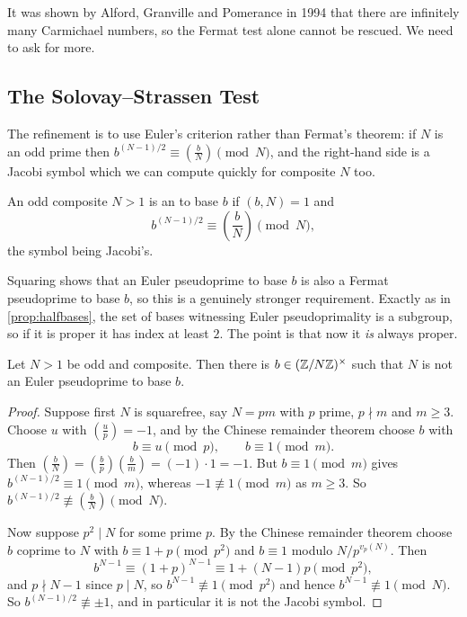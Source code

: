\documentclass[a4paper]{scrartcl}
\newcommand{\leg}[2]{\left( \frac{#1}{#2} \right)}
\begin{document}
It was shown by Alford, Granville and Pomerance in 1994 that there are infinitely many Carmichael numbers, so the Fermat test alone cannot be rescued. We need to ask for more.

\subsection{The Solovay--Strassen Test}

The refinement is to use Euler's criterion rather than Fermat's theorem: if $N$ is an odd prime then $b^{(N-1)/2} \equiv \left(\frac bN\right) \pmod N$, and the right-hand side is a Jacobi symbol which we can compute quickly for composite $N$ too.

\begin{definition}
	An odd composite $N > 1$ is an  to base $b$ if $(b, N) = 1$ and
	$$
	b^{(N-1)/2} \equiv \leg bN \pmod N,
	$$
	the symbol being Jacobi's.
\end{definition}

Squaring shows that an Euler pseudoprime to base $b$ is also a Fermat pseudoprime to base $b$, so this is a genuinely stronger requirement. Exactly as in \autoref{prop:halfbases}, the set of bases witnessing Euler pseudoprimality is a subgroup, so if it is proper it has index at least $2$. The point is that now it \emph{is} always proper.

\begin{theorem}\label{thm:eulerwitness}
	Let $N > 1$ be odd and composite. Then there is $b \in (\mathbb{Z}/N\mathbb{Z})^\times$ such that $N$ is not an Euler pseudoprime to base $b$.
\end{theorem}
\begin{proof}
	Suppose first $N$ is squarefree, say $N = pm$ with $p$ prime, $p \nmid m$ and $m \geq 3$. Choose $u$ with $\left(\frac up\right) = -1$, and by the Chinese remainder theorem choose $b$ with
	$$
	b \equiv u \pmod p, \qquad b \equiv 1 \pmod m.
	$$
	Then $\left(\frac bN\right) = \left(\frac bp\right)\left(\frac bm\right) = (-1)\cdot 1 = -1$. But $b \equiv 1 \pmod m$ gives $b^{(N-1)/2}\equiv 1 \pmod m$, whereas $-1 \not\equiv 1 \pmod m$ as $m \geq 3$. So $b^{(N-1)/2}\not\equiv\left(\frac bN\right) \pmod N$.

	Now suppose $p^2 \mid N$ for some prime $p$. By the Chinese remainder theorem choose $b$ coprime to $N$ with $b \equiv 1 + p \pmod{p^2}$ and $b \equiv 1$ modulo $N/p^{v_p(N)}$. Then
	$$
	b^{N-1} \equiv (1+p)^{N-1}\equiv 1 + (N-1)p \pmod{p^2},
	$$
	and $p \nmid N - 1$ since $p \mid N$, so $b^{N-1}\not\equiv1\pmod{p^2}$ and hence $b^{N-1}\not\equiv1\pmod N$. So $b^{(N-1)/2}\not\equiv\pm1$, and in particular it is not the Jacobi symbol.
\end{proof}
\end{document}
